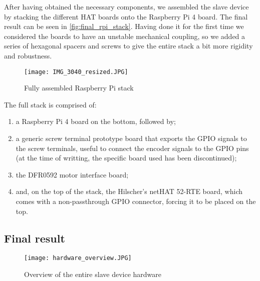 After having obtained the necessary components, we assembled the slave device by stacking the different HAT boards onto the Raspberry Pi 4 board.
The final result can be seen in \autoref{fig:final_rpi_stack}.
Having done it for the first time we considered the boards to have an unstable mechanical coupling, so we added a series of hexagonal spacers and screws to give the entire stack a bit more rigidity and robustness.

\begin{figure}[htp]
	\centering
	\texttt{[image: IMG\_3040\_resized.JPG]}
	\caption{Fully assembled Raspberry Pi stack}
	\label{fig:final_rpi_stack}
\end{figure}

The full stack is comprised of:
\begin{enumerate}
	\item a Raspberry Pi 4 board \cite{product:rpi4} on the bottom, followed by;
	\item a generic screw terminal prototype board that exports the GPIO signals to the screw terminals, useful to connect the encoder signals to the GPIO pins (at the time of writting, the specific board used has been discontinued);
	\item the DFR0592 motor interface board;
	\item and, on the top of the stack, the Hilscher's netHAT 52-RTE board, which comes with a non-passthrough GPIO connector, forcing it to be placed on the top.
\end{enumerate}

\subsection*{Final result}

\begin{figure}[htp]
	\centering
	\texttt{[image: hardware\_overview.JPG]}
	\caption{Overview of the entire slave device hardware}
	\label{fig:hardware_overview}
\end{figure}

